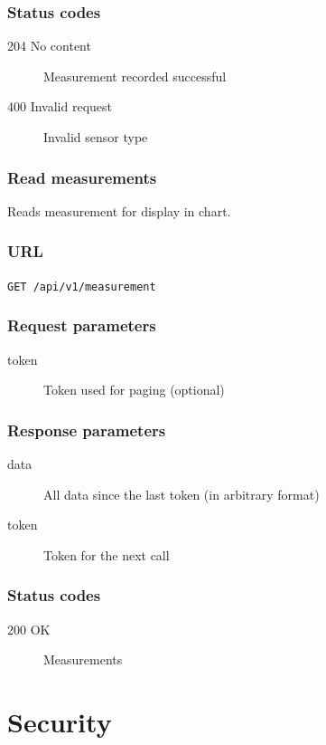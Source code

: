 \documentclass[a4paper,11pt]{scrartcl}
\begin{document}
\subsubsection*{Status codes}
\begin{description}
\item[204 No content] Measurement recorded successful
\item[400 Invalid request] Invalid sensor type
\end{description}

\subsubsection{Read measurements}
Reads measurement for display in chart.

\subsubsection*{URL}
\texttt{GET /api/v1/measurement}

\subsubsection*{Request parameters}
\begin{description}
\item[token] Token used for paging (optional)
\end{description}

\subsubsection*{Response parameters}
\begin{description}
\item[data] All data since the last token (in arbitrary format)
\item[token] Token for the next call
\end{description}

\subsubsection*{Status codes}
\begin{description}
\item[200 OK] Measurements
\end{description}

\section{Security}\label{sec:security}
\end{document}
